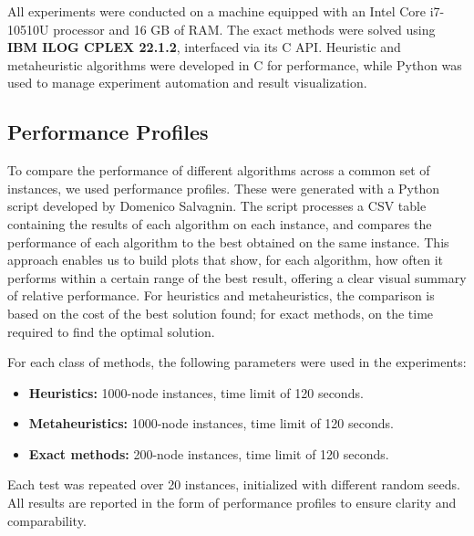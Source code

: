 All experiments were conducted on a machine equipped with an Intel Core i7-10510U processor and 16 GB of RAM. The exact methods were solved using \textbf{IBM ILOG CPLEX 22.1.2}, interfaced via its C API. Heuristic and metaheuristic algorithms were developed in C for performance, while Python was used to manage experiment automation and result visualization.

\subsection{Performance Profiles}

To compare the performance of different algorithms across a common set of instances, we used performance profiles. These were generated with a Python script developed by Domenico Salvagnin. The script processes a CSV table containing the results of each algorithm on each instance, and compares the performance of each algorithm to the best obtained on the same instance.
This approach enables us to build plots that show, for each algorithm, how often it performs within a certain range of the best result, offering a clear visual summary of relative performance. For heuristics and metaheuristics, the comparison is based on the cost of the best solution found; for exact methods, on the time required to find the optimal solution.

For each class of methods, the following parameters were used in the experiments:
\begin{itemize}
    \item \textbf{Heuristics:} 1000-node instances, time limit of 120 seconds.
    \item \textbf{Metaheuristics:} 1000-node instances, time limit of 120 seconds.
    \item \textbf{Exact methods:} 200-node instances, time limit of 120 seconds.
    
    
\end{itemize}

Each test was repeated over 20 instances, initialized with different random seeds. All results are reported in the form of performance profiles to ensure clarity and comparability.
